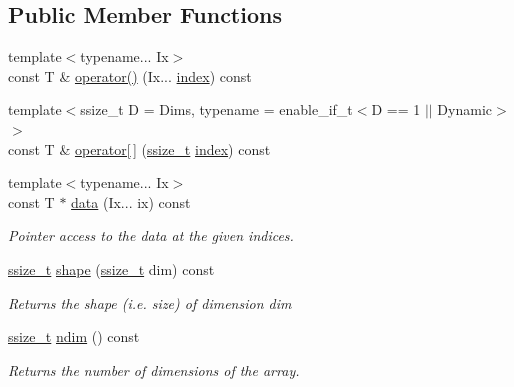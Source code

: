 \subsection*{Public Member Functions}
\begin{DoxyCompactItemize}
\item 
{\footnotesize template$<$typename... Ix$>$ }\\const T \& \mbox{\hyperlink{classunchecked__reference_a0da3998ef32834892f5b59529db3efd5}{operator()}} (Ix... \mbox{\hyperlink{_s_d_l__opengl__glext_8h_a57f14e05b1900f16a2da82ade47d0c6d}{index}}) const
\item 
{\footnotesize template$<$ssize\+\_\+t D = Dims, typename  = enable\+\_\+if\+\_\+t$<$\+D == 1 $\vert$$\vert$ Dynamic$>$$>$ }\\const T \& \mbox{\hyperlink{classunchecked__reference_a97fd086abe6908571f2089398d476105}{operator\mbox{[}$\,$\mbox{]}}} (\mbox{\hyperlink{detail_2common_8h_ac430d16fc097b3bf0a7469cfd09decda}{ssize\+\_\+t}} \mbox{\hyperlink{_s_d_l__opengl__glext_8h_a57f14e05b1900f16a2da82ade47d0c6d}{index}}) const
\item 
{\footnotesize template$<$typename... Ix$>$ }\\const T $\ast$ \mbox{\hyperlink{classunchecked__reference_a993c4ac6e09e82442f1d9741765faa97}{data}} (Ix... ix) const
\begin{DoxyCompactList}\small\item\em Pointer access to the data at the given indices. \end{DoxyCompactList}\item 
\mbox{\hyperlink{detail_2common_8h_ac430d16fc097b3bf0a7469cfd09decda}{ssize\+\_\+t}} \mbox{\hyperlink{classunchecked__reference_a5065c039307f9797f8d4dc8f9e422d82}{shape}} (\mbox{\hyperlink{detail_2common_8h_ac430d16fc097b3bf0a7469cfd09decda}{ssize\+\_\+t}} dim) const
\begin{DoxyCompactList}\small\item\em Returns the shape (i.\+e. size) of dimension {\ttfamily dim} \end{DoxyCompactList}\item 
\mbox{\hyperlink{detail_2common_8h_ac430d16fc097b3bf0a7469cfd09decda}{ssize\+\_\+t}} \mbox{\hyperlink{classunchecked__reference_a732200223a8d47f248fb9bab843dbe7a}{ndim}} () const
\begin{DoxyCompactList}\small\item\em Returns the number of dimensions of the array. \end{DoxyCompactList}\item 

\end{DoxyCompactItemize}
